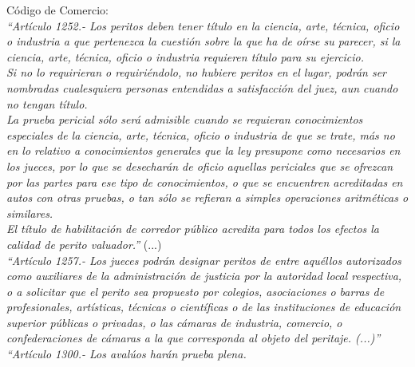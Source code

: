
\textcolor{principal}{C\'odigo de Comercio:}\\[10pt]

\textit{``Art\'iculo 1252.- Los peritos deben tener t\'itulo en la ciencia, arte, t\'ecnica, oficio o industria a que pertenezca la cuesti\'on sobre la que ha de o\'irse su parecer, si la ciencia, arte, t\'ecnica, oficio o industria requieren t\'itulo para su ejercicio.}\\[10pt]

\textit{Si no lo requirieran o requiri\'endolo, no hubiere peritos en el lugar, podr\'an ser nombradas cualesquiera personas entendidas a satisfacci\'on del juez, aun cuando no tengan t\'itulo.}\\

\textit{La prueba pericial s\'olo ser\'a admisible cuando se requieran conocimientos especiales de la ciencia, arte, t\'ecnica, oficio o industria de que se trate, m\'as no en lo relativo a conocimientos generales que la ley presupone como necesarios en los jueces, por lo que se desechar\'an de oficio aquellas periciales que se ofrezcan por las partes para ese tipo de conocimientos, o que se encuentren acreditadas en autos con otras pruebas, o tan s\'olo se refieran a simples operaciones aritm\'eticas o similares.} \\[10pt] 

\textit{El t\'itulo de habilitaci\'on de corredor p\'ublico acredita para todos los efectos la calidad de perito valuador.''} (...)\\[10pt]

\textit{``Art\'iculo 1257.- Los jueces podr\'an designar peritos de entre aqu\'ellos autorizados como auxiliares de la administraci\'on de justicia por la autoridad local respectiva, o a solicitar que el perito sea propuesto por colegios, asociaciones o barras de profesionales, art\'isticas, t\'ecnicas o cient\'ificas o de las instituciones de educaci\'on superior p\'ublicas o privadas, o las c\'amaras de industria, comercio, o confederaciones de c\'amaras a la que corresponda al objeto del peritaje.  (...)''}\\[10pt]

\textit{``Art\'iculo 1300.- Los aval\'uos har\'an prueba plena.}\\[10pt]

